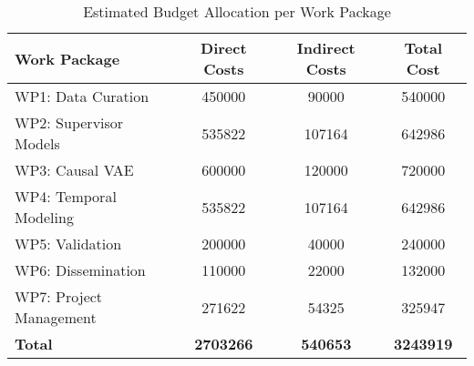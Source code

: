 \begin{table}[H]
\centering
\caption{Estimated Budget Allocation per Work Package}
\label{tab:budget_wp}
\begin{tabular}{lS[table-format=7.0]S[table-format=6.0]S[table-format=7.0]}
\toprule
\textbf{Work Package} & {\textbf{Direct Costs}} & {\textbf{Indirect Costs}} & {\textbf{Total Cost}} \\
\midrule
WP1: Data Curation & 450000 & 90000 & 540000 \\
WP2: Supervisor Models & 535822 & 107164 & 642986 \\
WP3: Causal VAE & 600000 & 120000 & 720000 \\
WP4: Temporal Modeling & 535822 & 107164 & 642986 \\
WP5: Validation & 200000 & 40000 & 240000 \\
WP6: Dissemination & 110000 & 22000 & 132000 \\
WP7: Project Management & 271622 & 54325 & 325947 \\
\midrule
\textbf{Total} & {\textbf{2703266}} & {\textbf{540653}} & {\textbf{3243919}} \\
\bottomrule
\end{tabular}
\end{table}